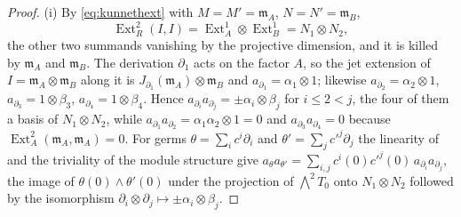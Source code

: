 \documentclass[11pt,reqno]{amsart}
\theoremstyle{plain}
\theoremstyle{definition}
\theoremstyle{remark}
\DeclareMathOperator{\Ext}{Ext}
\begin{document}
\begin{proof}
(i) By \eqref{eq:kunnethext} with $M=M'=\mathfrak m_{A}$, $N=N'=\mathfrak m_{B}$,
\[
  \Ext^{2}_{R}(I,I)=\Ext^{1}_{A}\otimes\Ext^{1}_{B}=N_{1}\otimes N_{2},
\]
the other two summands vanishing by the projective dimension, and it is killed
by $\mathfrak m_{A}$ and $\mathfrak m_{B}$. The derivation $\partial_{1}$ acts on
the factor $A$, so the jet extension of $I=\mathfrak m_{A}\otimes\mathfrak m_{B}$
along it is $J_{\partial_{1}}(\mathfrak m_{A})\otimes\mathfrak m_{B}$ and
$a_{\partial_{1}}=\alpha_{1}\otimes1$; likewise $a_{\partial_{2}}=\alpha_{2}\otimes1$,
$a_{\partial_{3}}=1\otimes\beta_{3}$, $a_{\partial_{4}}=1\otimes\beta_{4}$.
Hence $a_{\partial_{i}}a_{\partial_{j}}=\pm\alpha_{i}\otimes\beta_{j}$ for
$i\le2<j$, the four of them a basis of $N_{1}\otimes N_{2}$, while
$a_{\partial_{1}}a_{\partial_{2}}=\alpha_{1}\alpha_{2}\otimes1=0$ and
$a_{\partial_{3}}a_{\partial_{4}}=0$ because $\Ext^{2}_{A}(\mathfrak m_{A},\mathfrak m_{A})=0$.
For germs $\theta=\sum_{i}c^{i}\partial_{i}$ and $\theta'=\sum_{j}c'^{j}\partial_{j}$
the linearity of  and the triviality of the module structure
give $a_{\theta}a_{\theta'}=\sum_{i,j}c^{i}(0)c'^{j}(0)\,a_{\partial_{i}}a_{\partial_{j}}$,
the image of $\theta(0)\wedge\theta'(0)$ under the projection of
$\bigwedge^{2}T_{0}$ onto $N_{1}\otimes N_{2}$ followed by the isomorphism
$\partial_{i}\otimes\partial_{j}\mapsto\pm\alpha_{i}\otimes\beta_{j}$.


\end{proof}
\end{document}
